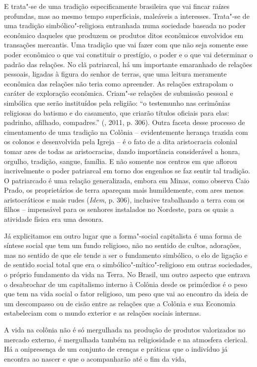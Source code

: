E trata"-se de uma tradição especificamente brasileira que vai fincar
raízes profundas, mas ao mesmo tempo superficiais, maleáveis a
interesses. Trata"-se de uma tradição simbólico"-religiosa entranhada numa
sociedade baseada no poder econômico daqueles que produzem os produtos
ditos econômicos envolvidos em transações mercantis. Uma tradição que
vai fazer com que não seja somente esse poder econômico o que vai
constituir o prestígio, o poder e o que vai determinar o padrão das
relações. No clã patriarcal, há um importante emaranhado de relações
pessoais, ligadas à figura do senhor de terras, que uma leitura
meramente econômica das relações não teria como apreender. As relações
extrapolam o caráter de exploração econômica. Criam"-se relações de
submissão pessoal e simbólica que serão instituídos pela religião: ``o
testemunho nas cerimônias religiosas do batismo e do casamento, que
criarão títulos oficiais para elas: padrinho, afilhado, compadres.''
(, 2011, p. 306). Outra faceta desse processo de cimentamento de
uma tradição na Colônia -- evidentemente herança trazida com os colonos
e desenvolvida pela Igreja -- é o fato de a dita aristocracia colonial
tomar ares de todas as aristocracias, dando importância considerável a
honra, orgulho, tradição, sangue, família. E não somente nos centros em
que aflorou incrivelmente o poder patriarcal em torno dos engenhos se
faz sentir tal tradição. O patriarcado é uma relação generalizada,
embora em Minas, como observa Caio Prado, os proprietários de terra
apareçam mais humildemente, com ares menos aristocráticos e mais rudes
(\emph{Idem}, p. 306), inclusive trabalhando a terra com os filhos --
impensável para os senhores instalados no Nordeste, para os quais a
atividade física era uma desonra.

Já explicitamos em outro lugar que a forma"-social capitalista é uma
forma de síntese social que tem um fundo religioso, não no sentido de
cultos, adorações, mas no sentido de que ele tende a ser o fundamento
simbólico, o elo de ligação e de sentido social total que era o
simbólico"-mítico"-religioso em outras sociedades, o próprio fundamento da
vida na Terra. No Brasil, um outro aspecto que entrava o desabrochar de
um capitalismo interno à Colônia desde os primórdios é o peso que tem na
vida social o fator religioso, um peso que vai ao encontro da ideia de
um descompasso ou de cisão entre as relações que a Colônia e sua
Economia estabeleciam com o mundo exterior e as relações sociais
internas.

A vida na colônia não é só mergulhada na produção de produtos
valorizados no mercado externo, é mergulhada também na religiosidade e
na atmosfera clerical. Há a onipresença de um conjunto de crenças e
práticas que o indivíduo já encontra ao nascer e que o acompanharão até
o fim da vida,

